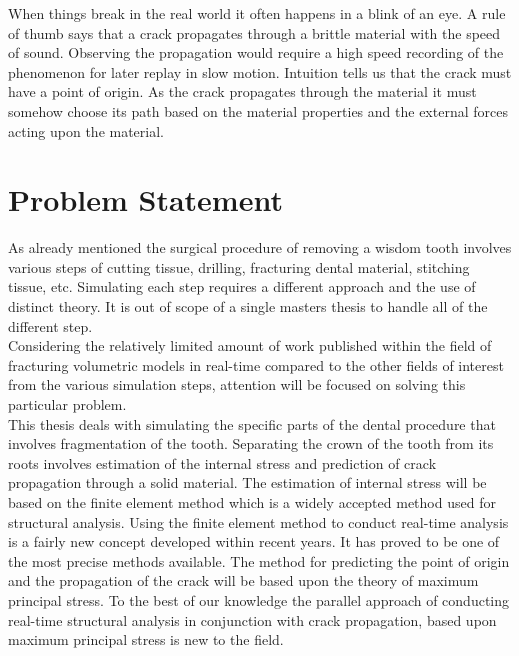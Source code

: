When things break in the real world it often happens in a blink of an
eye. A rule of thumb says that a crack propagates through a brittle
material with the speed of sound. Observing the propagation would
require a 
high speed recording of the phenomenon for later replay in slow motion.
Intuition tells us that the crack must have a point of origin. As the
crack propagates through the material it must somehow choose its path
based on the material properties and the external forces acting upon
the material. 



\section{Problem Statement}
\label{sec:problem_statement}

As already mentioned the surgical procedure of removing a wisdom tooth
involves various steps of cutting tissue, drilling, fracturing dental
material, stitching tissue, etc. Simulating each step requires a
different approach and the use of distinct theory. It is out of scope
of a single masters thesis to handle all of the different step. \\

%
Considering the relatively limited amount of work published
within the field of fracturing volumetric models in real-time
compared to the other fields of interest from the various simulation
steps, attention will be focused on solving this particular problem. \\

This thesis deals with simulating the specific parts of the
dental procedure that involves fragmentation of the tooth. Separating the
crown of the tooth from its roots involves estimation of the internal
stress and prediction of crack propagation through a solid material. 
%
The estimation of internal stress will be based on the finite element
method which is a widely accepted method used for structural
analysis. Using the finite element method to conduct real-time
analysis is a fairly new concept developed within recent years. It
has proved to be one of the most precise methods available.
%
The method for predicting the point of origin and the propagation of
the crack will be based upon the theory of maximum principal
stress. 
%
To the best of our knowledge the parallel approach of conducting real-time
structural analysis in conjunction with crack propagation, based
upon maximum principal stress is new to the field. \\

